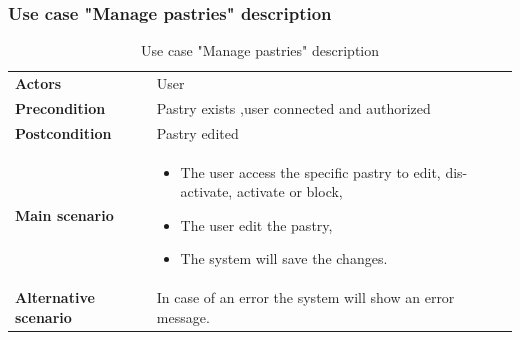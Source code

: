\documentclass[12pt,a4paper]{report}
\begin{document}
\subsubsection*{Use case "Manage pastries" description}
\begin{table}[H]
	\begin{center}
		\captionsetup[table]{skip=10pt}
		\caption{Use case "Manage pastries" description}
		\setlength\doublerulesep{0.5pt}
		\begin{tabular}{|  p{5cm}|  p{9cm}|}
			\rowcolor{LightCyan}
			
			\hline
			\multicolumn{2}{c}{Use case "Manage pastries"}\\
			\hline
			
			\textbf{Actors} &                        
			User 
			\\ \hline
			
			\textbf{Precondition} &                        
			Pastry exists ,user connected and authorized
			\\ \hline
			\textbf{Postcondition} &                        
			Pastry edited
			\\ \hline
			
			\textbf{Main scenario} &                        
			
				\begin{itemize}
					\item The user access the specific pastry to edit, dis-activate, activate or block,
					\item The user edit the pastry,
					\item The system will save the changes.
				\end{itemize}
				
			\\ \hline
			
			\textbf{Alternative scenario} &                        
			In case of an error the system will show an error message.
			\\ \hline
			
			
		\end{tabular}
		
	\end{center}
	
\end{table}
\end{document}
